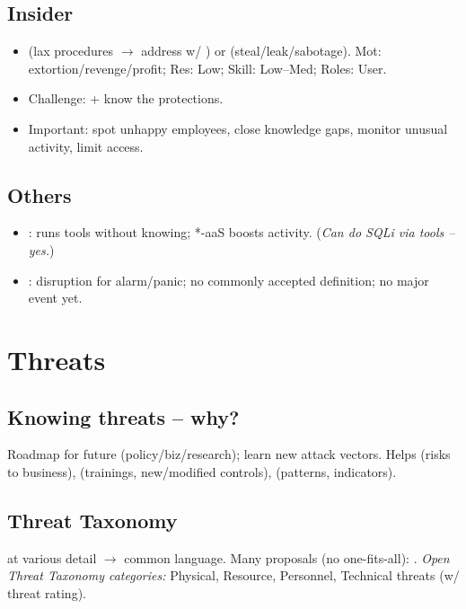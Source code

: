 \subsection{Insider}
\begin{itemize}
\item {} (lax procedures $\to$ address w/ ) or  (steal/leak/sabotage). Mot: extortion/revenge/profit; Res: Low; Skill: Low--Med; Roles: User.
\item Challenge:  + know the protections.
\item Important: spot unhappy employees, close knowledge gaps, monitor unusual activity, limit access.
\end{itemize}

\subsection{Others}
\begin{itemize}
\item {}: runs tools without knowing; *-aaS boosts activity. (\textit{Can do SQLi via tools -- yes.})
\item {}: disruption for alarm/panic; no commonly accepted definition; no major event yet.
\end{itemize}

\section{Threats}

\subsection{Knowing threats -- why?}
Roadmap for future (policy/biz/research); learn new attack vectors. Helps  (risks to business),  (trainings, new/modified controls),  (patterns, indicators).

\subsection{Threat Taxonomy}
 at various detail $\to$ common language. Many proposals (no one-fits-all): .
\textit{Open Threat Taxonomy categories:} Physical, Resource, Personnel, Technical threats (w/ threat rating).

